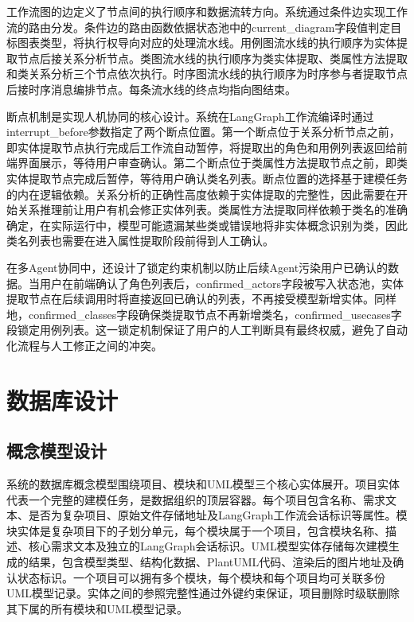 工作流图的边定义了节点间的执行顺序和数据流转方向。系统通过条件边实现工作流的路由分发。条件边的路由函数依据状态池中的current\_diagram字段值判定目标图表类型，将执行权导向对应的处理流水线。用例图流水线的执行顺序为实体提取节点后接关系分析节点。类图流水线的执行顺序为类实体提取、类属性方法提取和类关系分析三个节点依次执行。时序图流水线的执行顺序为时序参与者提取节点后接时序消息编排节点。每条流水线的终点均指向图结束。

断点机制是实现人机协同的核心设计。系统在LangGraph工作流编译时通过interrupt\_before参数指定了两个断点位置。第一个断点位于关系分析节点之前，即实体提取节点执行完成后工作流自动暂停，将提取出的角色和用例列表返回给前端界面展示，等待用户审查确认。第二个断点位于类属性方法提取节点之前，即类实体提取节点完成后暂停，等待用户确认类名列表。断点位置的选择基于建模任务的内在逻辑依赖。关系分析的正确性高度依赖于实体提取的完整性，因此需要在开始关系推理前让用户有机会修正实体列表。类属性方法提取同样依赖于类名的准确确定，在实际运行中，模型可能遗漏某些类或错误地将非实体概念识别为类，因此类名列表也需要在进入属性提取阶段前得到人工确认。

在多Agent协同中，还设计了锁定约束机制以防止后续Agent污染用户已确认的数据。当用户在前端确认了角色列表后，confirmed\_actors字段被写入状态池，实体提取节点在后续调用时将直接返回已确认的列表，不再接受模型新增实体。同样地，confirmed\_classes字段确保类提取节点不再新增类名，confirmed\_usecases字段锁定用例列表。这一锁定机制保证了用户的人工判断具有最终权威，避免了自动化流程与人工修正之间的冲突。

\section{数据库设计}

\subsection{概念模型设计}

系统的数据库概念模型围绕项目、模块和UML模型三个核心实体展开。项目实体代表一个完整的建模任务，是数据组织的顶层容器。每个项目包含名称、需求文本、是否为复杂项目、原始文件存储地址及LangGraph工作流会话标识等属性。模块实体是复杂项目下的子划分单元，每个模块属于一个项目，包含模块名称、描述、核心需求文本及独立的LangGraph会话标识。UML模型实体存储每次建模生成的结果，包含模型类型、结构化数据、PlantUML代码、渲染后的图片地址及确认状态标识。一个项目可以拥有多个模块，每个模块和每个项目均可关联多份UML模型记录。实体之间的参照完整性通过外键约束保证，项目删除时级联删除其下属的所有模块和UML模型记录。


